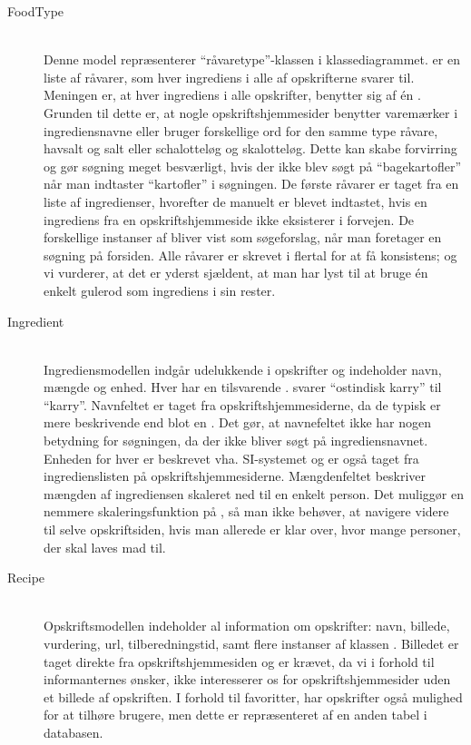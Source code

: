 \begin{description}

  \item[FoodType] \hfill \\
    Denne model repræsenterer ``råvaretype''-klassen i klassediagrammet.  er en liste af råvarer, som hver ingrediens i alle af opskrifterne svarer til. Meningen er, at hver ingrediens i alle opskrifter, benytter sig af én . Grunden til dette er, at nogle opskriftshjemmesider benytter varemærker i ingrediensnavne eller bruger forskellige ord for den samme type råvare, \fx havsalt og salt eller schalotteløg og skalotteløg. Dette kan skabe forvirring og gør søgning meget besværligt, hvis der ikke blev søgt på ``bagekartofler'' når man indtaster ``kartofler'' i søgningen. De første råvarer er taget fra en liste af ingredienser\cite{ingrediensliste}, hvorefter de manuelt er blevet indtastet, hvis en ingrediens fra en opskriftshjemmeside ikke eksisterer i forvejen. De forskellige instanser af  bliver \fx vist som søgeforslag, når man foretager en søgning på forsiden. Alle råvarer er skrevet i flertal for at få konsistens; og vi vurderer, at det er yderst sjældent, at man har lyst til \fx at bruge én enkelt gulerod som ingrediens i sin rester.

  \item[Ingredient] \hfill \\
    Ingrediensmodellen indgår udelukkende i opskrifter og indeholder navn, mængde og enhed. Hver  har en tilsvarende . \Fx svarer ``ostindisk karry'' til ``karry''. Navnfeltet er taget fra opskriftshjemmesiderne, da de typisk er mere beskrivende end blot en . Det gør, at navnefeltet ikke har nogen betydning for søgningen, da der ikke bliver søgt på ingrediensnavnet. Enheden for hver  er beskrevet vha. SI-systemet og er også taget fra ingredienslisten på opskriftshjemmesiderne. Mængdenfeltet beskriver mængden af ingrediensen skaleret ned til en enkelt person. Det muliggør en nemmere skaleringsfunktion på \Foodl{}, så man ikke behøver, at navigere videre til selve opskriftsiden, hvis man allerede er klar over, hvor mange personer, der skal laves mad til.

  \item[Recipe] \hfill \\
    Opskriftsmodellen indeholder al information om opskrifter: navn, billede, vurdering, url, tilberedningstid, samt flere instanser af klassen . Billedet er taget direkte fra opskriftshjemmesiden og er krævet, da vi i forhold til informanternes ønsker, ikke interesserer os for opskriftshjemmesider uden et billede af opskriften. I forhold til favoritter, har opskrifter også mulighed for at tilhøre brugere, men dette er repræsenteret af en anden tabel i databasen.  


\end{description}
